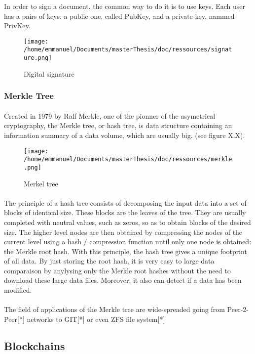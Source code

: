 In order to sign a document, the common way to do it is to use keys. Each user has a pairs of keys: a public one, called PubKey, and a private key, nammed PrivKey.
\begin{figure}[htp]
\centering
\texttt{[image: /home/emmanuel/Documents/masterThesis/doc/ressources/signature.png]}
\caption{Digital signature}
\label{}
\end{figure}

\subsubsection{Merkle Tree}
\paragraph{}
Created in 1979 by Ralf Merkle, one of the pionner of the asymetrical cryptography, the Merkle tree, or hash tree, is data structure containing an information summary of a data volume, which are usually big. (see figure X.X).
\begin{figure}[!h]
\centering
\texttt{[image: /home/emmanuel/Documents/masterThesis/doc/ressources/merkle.png]}
\caption{Merkel tree}
\label{}
\end{figure}
\paragraph{}
The principle of a hash tree consists of decomposing the input data into a set of blocks of identical size. These blocks are the leaves of the tree. They are usually completed with neutral values, such as zeros, so as to obtain blocks of the desired size. The higher level nodes are then obtained by compressing the nodes of the current level using a hash / compression function until only one node is obtained: the Merkle root hash.
With this principle, the hash tree gives a unique footprint of all data. By just storing the root hash, it is very easy to large data comparaison by anylysing only the Merkle root hashes without the need to download these large data files. Moreover, it also can detect if a data has been modified. 
\paragraph{}
The field of applications of the Merkle tree are wide-spreaded going from Peer-2-Peer[*] networks to GIT[*] or even ZFS file system[*]

\subsection{Blockchains}
